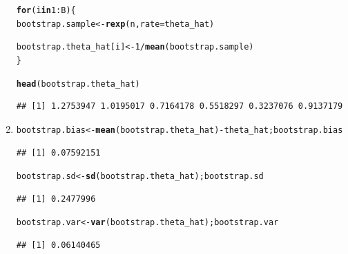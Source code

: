 \documentclass[11pt, a4paper]{article}\usepackage[]{graphicx}\usepackage[]{xcolor}
\makeatletter
\newcommand{\hlnum}[1]{\textcolor[rgb]{0.686,0.059,0.569}{#1}}%
\newcommand{\hlopt}[1]{\textcolor[rgb]{0,0,0}{#1}}%
\newcommand{\hldef}[1]{\textcolor[rgb]{0.345,0.345,0.345}{#1}}%
\newcommand{\hlkwa}[1]{\textcolor[rgb]{0.161,0.373,0.58}{\textbf{#1}}}%
\newcommand{\hlkwb}[1]{\textcolor[rgb]{0.69,0.353,0.396}{#1}}%
\newcommand{\hlkwc}[1]{\textcolor[rgb]{0.333,0.667,0.333}{#1}}%
\newcommand{\hlkwd}[1]{\textcolor[rgb]{0.737,0.353,0.396}{\textbf{#1}}}%
\newenvironment{kframe}{%
 \def\at@end@of@kframe{}%
 \ifinner\ifhmode%
  \def\at@end@of@kframe{\end{minipage}}%
  \begin{minipage}{\columnwidth}%
 \fi\fi%
 \def\FrameCommand##1{\hskip\@totalleftmargin \hskip-\fboxsep
 \colorbox{shadecolor}{##1}\hskip-\fboxsep
     \hskip-\linewidth \hskip-\@totalleftmargin \hskip\columnwidth}%
 \MakeFramed {\advance\hsize-\width
   \@totalleftmargin\z@ \linewidth\hsize
   \@setminipage}}%
 {\par\unskip\endMakeFramed%
 \at@end@of@kframe}
\newenvironment{knitrout}{}{} %
\makeatother
\begin{document}
\begin{enumerate}
\begin{knitrout}
\begin{kframe}
\begin{alltt}
\hlkwa{for}\hldef{(i} \hlkwa{in} \hlnum{1}\hlopt{:}\hldef{B)\{}
  \hldef{bootstrap.sample} \hlkwb{<-} \hlkwd{rexp}\hldef{(n,} \hlkwc{rate} \hldef{= theta_hat)}

  \hldef{bootstrap.theta_hat[i]} \hlkwb{<-} \hlnum{1} \hlopt{/} \hlkwd{mean}\hldef{(bootstrap.sample)}
\hldef{\}}

\hlkwd{head}\hldef{(bootstrap.theta_hat)}
\end{alltt}
\begin{verbatim}
## [1] 1.2753947 1.0195017 0.7164178 0.5518297 0.3237076 0.9137179
\end{verbatim}
\end{kframe}
\end{knitrout}

\item[\scalebox{2.0}{\twemoji{keycap: 3}}]

\begin{knitrout}
\color{fgcolor}\begin{kframe}
\begin{alltt}
\hldef{bootstrap.bias} \hlkwb{<-} \hlkwd{mean}\hldef{(bootstrap.theta_hat)} \hlopt{-} \hldef{theta_hat; bootstrap.bias}
\end{alltt}
\begin{verbatim}
## [1] 0.07592151
\end{verbatim}
\end{kframe}
\end{knitrout}

\begin{knitrout}
\color{fgcolor}\begin{kframe}
\begin{alltt}
\hldef{bootstrap.sd} \hlkwb{<-} \hlkwd{sd}\hldef{(bootstrap.theta_hat); bootstrap.sd}
\end{alltt}
\begin{verbatim}
## [1] 0.2477996
\end{verbatim}
\end{kframe}
\end{knitrout}

\begin{knitrout}
\color{fgcolor}\begin{kframe}
\begin{alltt}
\hldef{bootstrap.var} \hlkwb{<-} \hlkwd{var}\hldef{(bootstrap.theta_hat); bootstrap.var}
\end{alltt}
\begin{verbatim}
## [1] 0.06140465
\end{verbatim}
\end{kframe}
\end{knitrout}



\end{enumerate}
\end{document}
